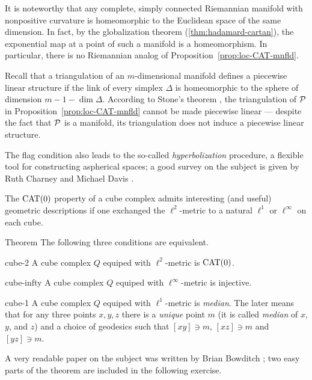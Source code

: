 It is noteworthy that any complete, simply connected Riemannian manifold with nonpositive curvature is homeomorphic to the Euclidean space of the same dimension.
In fact, by the globalization theorem
(\ref{thm:hadamard-cartan}), 
the exponential map at a point of such a manifold is a homeomorphism.
In particular, there is no Riemannian analog of Proposition~\ref{prop:loc-CAT-mnfld}.

Recall that a triangulation of an $m$-dimensional manifold defines a piecewise linear structure if the link  of every simplex $\Delta$ is homeomorphic to the sphere of dimension $m-1-\dim\Delta$.
According to Stone's theorem \cite{stone, davis-januszkiewicz}, the triangulation of $\mathcal{P}$ in Proposition~\ref{prop:loc-CAT-mnfld} 
cannot be made piecewise linear --- despite  the fact that $\mathcal{P}$ is a manifold, its triangulation does not induce a piecewise linear structure.

The flag condition also leads to the so-called {}\emph{hyperbolization} procedure, a flexible tool for constructing  aspherical spaces;
a good survey on the subject is given by Ruth Charney and Michael Davis \cite{charney-davis-1995}.

The $\mathrm{CAT}(0)$ property of a cube complex admits interesting (and useful) geometric descriptions if one exchanged the $\ell^2$-metric to a natural $\ell^1$ or $\ell^\infty$ on each cube.

\begin{thm}{Theorem}
The following three conditions are equivalent.

\begin{subthm}{cube-2} A cube complex $Q$ equiped with $\ell^2$-metric is $\mathrm{CAT}(0)$.
\end{subthm}

\begin{subthm}{cube-infty} A cube complex $Q$ equiped with $\ell^\infty$-metric is injective.
\end{subthm}

\begin{subthm}{cube-1} A cube complex $Q$ equiped with $\ell^1$-metric is \emph{median}.
 The later means that for any three points $x,y,z$ there is a {}\emph{unique} point $m$ (it is called \emph{median} of $x$, $y$, and $z$) and a choice of geodesics such that $[xy]\ni m$, $[xz]\ni m$ and $[yz]\ni m$.
\end{subthm}
\end{thm}

A very readable paper on the subject was written by Brian Bowditch \cite{bowditch-2020}; two easy parts of the theorem are included in the following exercise.

